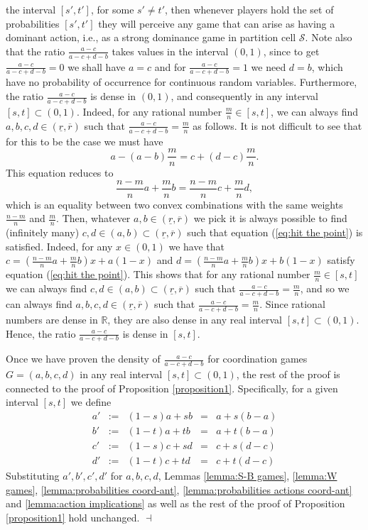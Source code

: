 \documentclass[fleqn,reqno,12pt]{article}
\theoremstyle{Satz}
\theoremstyle{Bsp}
\begin{document}
the interval $[s',t']$, for some $s'\neq t'$, then whenever players
hold the set of probabilities $[s',t']$ they will perceive any game
that can arise as having a dominant action, i.e., as a strong dominance
game in partition cell $\mathcal{S}$. Note also that the ratio $\frac{a-c}{a-c+d-b}$
takes values in the interval $(0,1)$, since to get $\frac{a-c}{a-c+d-b}=0$
we shall have $a=c$ and for $\frac{a-c}{a-c+d-b}=1$ we need $d=b$,
which have no probability of occurrence for continuous random variables.
Furthermore, the ratio $\frac{a-c}{a-c+d-b}$ is dense in $(0,1)$,
and consequently in any interval $[s,t]\subset(0,1)$. Indeed, for
any rational number $\frac{m}{n}\in[s,t]$, we can always find $a,b,c,d\in(\underline{r},\overline{r})$
such that $\frac{a-c}{a-c+d-b}=\frac{m}{n}$ as follows. It is not
difficult to see that for this to be the case we must have 
\[
a-(a-b)\frac{m}{n}=c+(d-c)\frac{m}{n}.
\]
This equation reduces to
\begin{equation}
\frac{n-m}{n}a+\frac{m}{n}b=\frac{n-m}{n}c+\frac{m}{n}d,\label{eq:hit the point}
\end{equation}
which is an equality between two convex combinations with the same
weights $\frac{n-m}{n}$ and $\frac{m}{n}$. Then, whatever $a,b\in(\underline{r},\overline{r})$
we pick it is always possible to find (infinitely many) $c,d\in(a,b)\subset(\underline{r},\overline{r})$
such that equation (\ref{eq:hit the point}) is satisfied. Indeed,
for any $x\in(0,1)$ we have that $c=(\frac{n-m}{n}a+\frac{m}{n}b)x+a(1-x)$
and $d=(\frac{n-m}{n}a+\frac{m}{n}b)x+b(1-x)$ satisfy equation (\ref{eq:hit the point}).
This shows that for any rational number $\frac{m}{n}\in[s,t]$ we
can always find $c,d\in(a,b)\subset(\underline{r},\overline{r})$
such that $\frac{a-c}{a-c+d-b}=\frac{m}{n}$, and so we can always
find $a,b,c,d\in(\underline{r},\overline{r})$ such that $\frac{a-c}{a-c+d-b}=\frac{m}{n}$.
Since rational numbers are dense in $\mathbb{R}$, they are also dense
in any real interval $[s,t]\subset(0,1)$. Hence, the ratio $\frac{a-c}{a-c+d-b}$
is dense in $[s,t]$.

Once we have proven the density of $\frac{a-c}{a-c+d-b}$ for coordination
games $G=(a,b,c,d)$ in any real interval $[s,t]\subset(0,1)$, the
rest of the proof is connected to the proof of Proposition \ref{proposition1}. Specifically,
for a given interval $[s,t]$ we define
\begin{equation}
\begin{array}{ccccc}
a' & := & (1-s)a+sb & = & a+s(b-a)\\
b' & := & (1-t)a+tb & = & a+t(b-a)\\
c' & := & (1-s)c+sd & = & c+s(d-c)\\
d' & := & (1-t)c+td & = & c+t(d-c)
\end{array}\label{eq:a'b'c'd'}
\end{equation}
Substituting $ a',b',c',d'$ for $a,b,c,d$, Lemmas \ref{lemma:S-B games}, \ref{lemma:W games}, \ref{lemma:probabilities coord-ant}, \ref{lemma:probabilities actions coord-ant} and \ref{lemma:action implications} as well as the rest of the proof of Proposition \ref{proposition1} hold unchanged. \hfill $\dashv$



\newpage

\printbibliography[heading=bibintoc]
\end{document}
